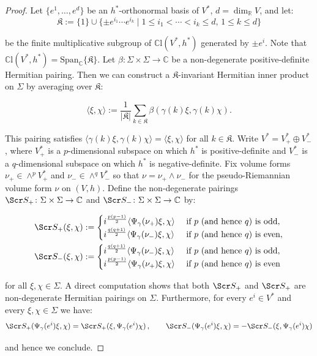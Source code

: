 \documentclass[10pt,a4paper,twoside,reqno]{amsart}
\theoremstyle{plain}
\theoremstyle{definition}
\theoremstyle{remark}
\def\C{\mathbb{C}}
\def\R{\mathbb{R}}
\def\scS{\Scr S}
\def\R{\mathbb{R}}
\newcommand{\abs}[1]{\left\lvert#1\right\rvert}
\newcommand{\escal}[1]{\langle#1\rangle}
\def\Span{\mathrm{Span}}
\begin{document}
\begin{proof}
Let $\{e^1,\ldots,e^{d}\}$ be an $h^*$-orthonormal basis of $V^*$, $d=\dim_\R V$, and let:
\begin{equation}\label{eq:group_units_K}
\mathfrak{K} := \{1\}\cup\{\pm e^{i_1}\cdots e^{i_k}\mid 1\leq i_1<\cdots<i_k\leq d,\,1\leq k\leq d\}
\end{equation}

\noindent
be the finite multiplicative subgroup of $\C\mathrm{l}(V^*,h^*)$ generated by $\pm e^i$. Note that $\C\mathrm{l}(V^*,h^*)=\Span_\C\{ \mathfrak{K} \}$. Let $\beta \colon \Sigma \times \Sigma \to \C$ be a non-degenerate positive-definite Hermitian pairing. Then we can construct a $\mathfrak{K}$-invariant Hermitian inner product on $\Sigma$ by averaging over $\mathfrak{K}$:

\begin{equation*}
\escal{\xi,\chi}:=\frac{1}{\abs{\mathfrak{K}}}\sum_{k\in \mathfrak{K}}\beta(\gamma(k)\xi,\gamma(k)\chi).
\end{equation*}

\noindent
This pairing satisfies $\escal{\gamma(k)\xi,\gamma(k)\chi}=\escal{\xi,\chi}$ for all $k\in \mathfrak{K}$. Write $V^*=V^*_+\oplus V^*_-$, where $V^*_+$ is a $p$-dimensional subspace on which $h^*$ is positive-definite and $V^*_-$ is a $q$-dimensional subspace on which $h^*$ is negative-definite. Fix volume forms $\nu_+\in\wedge^pV^*_+$ and $\nu_-\in\wedge^qV^*_-$ so that $\nu = \nu_+\wedge\nu_-$ for the pseudo-Riemannian volume form $\nu$ on $(V,h)$. Define the non-degenerate pairings $\scS_{+} \colon\Sigma\times\Sigma\to\C$ and $\scS_{-} \colon\Sigma\times\Sigma\to\C$ by:

\begin{align*}
\scS_{+}(\xi,\chi)&:=\begin{cases}
    i^{\frac{p(p-1)}{2}}\escal{\Psi_\gamma(\nu_{+})\xi,\chi}&\text{ if $p$ (and hence $q$) is odd},\\
    i^{\frac{q(q+1)}{2}} \escal{\Psi_\gamma(\nu_{-})\xi,\chi}&\text{ if $p$ (and hence $q$) is even},
    \end{cases}\\
\scS_{-}(\xi,\chi)&:=\begin{cases}
    i^{\frac{q(q+1)}{2}} \escal{\Psi_\gamma(\nu_{-})\xi,\chi}&\text{ if $p$ (and hence $q$) is odd},\\
    i^{\frac{p(p-1)}{2}}\escal{\Psi_\gamma(\nu_{+})\xi,\chi}&\text{ if $p$ (and hence $q$) is even}
    \end{cases}
\end{align*}

\noindent
for all $\xi,\chi\in\Sigma$. A direct computation shows that both $\scS_{+}$ and $\scS_{+}$ are non-degenerate Hermitian pairings on $\Sigma$. Furthermore, for every $e^i\in V^*$ and every $\xi , \chi \in \Sigma$ we have:
\begin{eqnarray*}
\scS_{+}(\Psi_\gamma(e^i)\xi , \chi) = \scS_{+}( \xi , \Psi_\gamma(e^i)\chi)\, , \qquad \scS_{-}(\Psi_\gamma(e^i)\xi , \chi) = - \scS_{-}( \xi , \Psi_\gamma(e^i)\chi)
\end{eqnarray*}

\noindent
and hence we conclude.
\end{proof}
\end{document}
